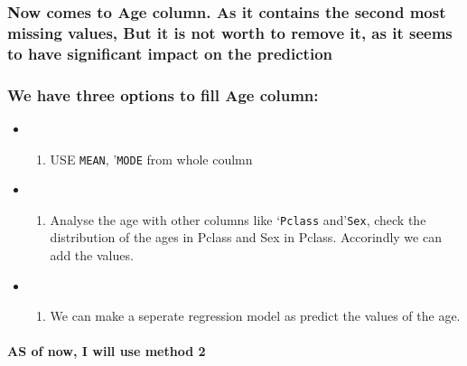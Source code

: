 \documentclass[11pt]{article}
\providecommand{\tightlist}{%
      \setlength{\itemsep}{0pt}\setlength{\parskip}{0pt}}
\begin{document}
    \hypertarget{now-comes-to-age-column.-as-it-contains-the-second-most-missing-values-but-it-is-not-worth-to-remove-it-as-it-seems-to-have-significant-impact-on-the-prediction}{%
\subsubsection{Now comes to Age column. As it contains the second most
missing values, But it is not worth to remove it, as it seems to have
significant impact on the
prediction}\label{now-comes-to-age-column.-as-it-contains-the-second-most-missing-values-but-it-is-not-worth-to-remove-it-as-it-seems-to-have-significant-impact-on-the-prediction}}

\hypertarget{we-have-three-options-to-fill-age-column}{%
\subsubsection{We have three options to fill Age
column:}\label{we-have-three-options-to-fill-age-column}}

\begin{itemize}
\item
  \begin{enumerate}
  \def\labelenumi{\arabic{enumi})}
  \tightlist
  \item
    USE \texttt{\textquotesingle{}MEAN\textquotesingle{}},
    '\texttt{MODE\textquotesingle{}} from whole coulmn
  \end{enumerate}
\item
  \begin{enumerate}
  \def\labelenumi{\arabic{enumi})}
  \setcounter{enumi}{1}
  \tightlist
  \item
    Analyse the age with other columns like
    `\texttt{Pclass\textquotesingle{}}
    and'\texttt{Sex\textquotesingle{}}, check the distribution of the
    ages in Pclass and Sex in Pclass. Accorindly we can add the values.
  \end{enumerate}
\item
  \begin{enumerate}
  \def\labelenumi{\arabic{enumi})}
  \setcounter{enumi}{2}
  \tightlist
  \item
    We can make a seperate regression model as predict the values of the
    age.
  \end{enumerate}
\end{itemize}

\hypertarget{as-of-now-i-will-use-method-2}{%
\paragraph{AS of now, I will use method
2}\label{as-of-now-i-will-use-method-2}}
\end{document}
